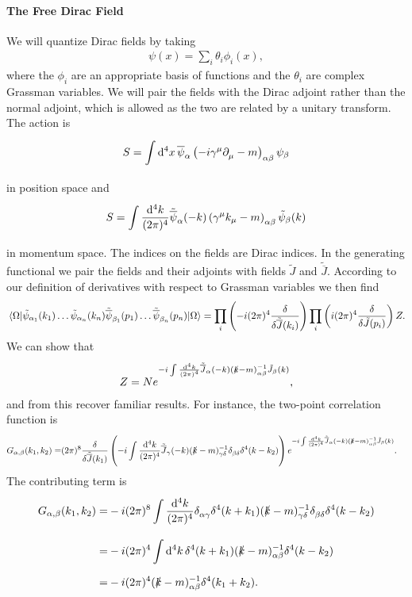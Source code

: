 \paragraph{The Free Dirac Field}
We will quantize Dirac fields by taking
\begin{align*}
	\psi(x) = \sum\limits_{i}\theta_{i}\phi_{i}(x),
\end{align*}
where the $\phi_{i}$ are an appropriate basis of functions and the $\theta_{i}$ are complex Grassman variables. We will pair the fields with the Dirac adjoint rather than the normal adjoint, which is allowed as the two are related by a unitary transform. The action is
\begin{align*}
	S = \int\limits_{}^{}\dd[4]{x}\overline{\psi}_{\alpha}\left(-i\gamma^{\mu}\partial^{}_{\mu} - m\right)_{\alpha\beta}\psi_{\beta}
\end{align*}
in position space and
\begin{align*}
	S = \int\limits_{}^{}\frac{\dd[4]{k}}{(2\pi)^{4}}\tilde{\overline{\psi}}_{\alpha}(-k)\left(\gamma^{\mu}k_{\mu} - m\right)_{\alpha\beta}\tilde{\psi}_{\beta}(k)
\end{align*}
in momentum space. The indices on the fields are Dirac indices. In the generating functional we pair the fields and their adjoints with fields $\tilde{J}$ and $\tilde{\overline{J}}$. According to our definition of derivatives with respect to Grassman variables we then find
\begin{align*}
	\expval{\tilde{\psi}_{\alpha_{1}}(k_{1})\dots\tilde{\psi}_{\alpha_{n}}(k_{n})\tilde{\overline{\psi}}_{\beta_{1}}(p_{1})\dots\tilde{\overline{\psi}}_{\beta_{n}}(p_{n})}{\Omega} = \prod\limits_{i}\left(-i(2\pi)^{4}\fdv{\tilde{\overline{J}}(k_{i})}\right)\prod\limits_{i}\left(i(2\pi)^{4}\fdv{\tilde{J}(p_{i})}\right)Z.
\end{align*}
We can show that
\begin{align*}
	Z = Ne^{-i\int\limits_{}^{}\frac{\dd[4]{k}}{(2\pi)^{4}}\tilde{\overline{J}}_{\alpha}(-k)(\slashed{k} - m)_{\alpha\beta}^{-1}\tilde{J}_{\beta}(k)},
\end{align*}
and from this recover familiar results. For instance, the two-point correlation function is
\begin{align*}
	G_{\alpha, \beta}(k_{1}, k_{2}) =& (2\pi)^{8}\fdv{\tilde{\overline{J}}(k_{1})}\left(-i\inte{}{}\frac{\dd[4]{k}}{(2\pi)^{4}}\tilde{\overline{J}}_{\gamma}(-k)(\fsl{k} - m)_{\gamma\delta}^{-1}\kdelta{}{\beta\delta}\delta^{4}(k - k_{2})\right)e^{-i\inte{}{}\frac{\dd[4]{k}}{(2\pi)^{4}}\tilde{\overline{J}}_{\alpha}(-k)(\fsl{k} - m)_{\alpha\beta}^{-1}\tilde{J}_{\beta}(k)}.
\end{align*}
The contributing term is
\begin{align*}
	G_{\alpha, \beta}(k_{1}, k_{2}) =& -i(2\pi)^{8}\inte{}{}\frac{\dd[4]{k}}{(2\pi)^{4}}\kdelta{}{\alpha\gamma}\delta^{4}(k + k_{1})(\fsl{k} - m)_{\gamma\delta}^{-1}\kdelta{}{\beta\delta}\delta^{4}(k - k_{2}) \\
	=& -i(2\pi)^{4}\inte{}{}\dd[4]{k}\delta^{4}(k + k_{1})(\fsl{k} - m)_{\alpha\beta}^{-1}\delta^{4}(k - k_{2}) \\
	=& -i(2\pi)^{4}(\fsl{k} - m)_{\alpha\beta}^{-1}\delta^{4}(k_{1} + k_{2}).
\end{align*}

